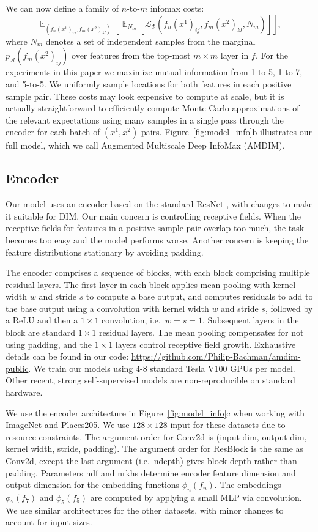 \documentclass{article}
\newcommand{\AAA}{\mathcal{A}}
\newcommand{\LL}{\mathcal{L}}
\DeclareMathOperator*{\expect}{\mathbb{E}}
\begin{document}
We can now define a family of $n$-to-$m$ infomax costs:
\begin{equation}
\expect_{(f_n(x^1)_{ij}, f_m(x^2)_{kl})} \left[ \expect_{N_m} \left[ \LL_{\Phi}(f_n(x^1)_{ij}, f_m(x^2)_{kl}, N_m) \right] \right],
\label{eq:nce_info_bound_n2m}
\end{equation}
where $N_m$ denotes a set of independent samples from the marginal $p_{\AAA}(f_m(x^2)_{ij})$ over features from the top-most $m \times m$ layer in $f$. For the experiments in this paper we maximize mutual information from 1-to-5, 1-to-7, and 5-to-5. We uniformly sample locations for both features in each positive sample pair. These costs may look expensive to compute at scale, but it is actually straightforward to efficiently compute Monte Carlo approximations of the relevant expectations using many samples in a single pass through the encoder for each batch of $(x^1, x^2)$ pairs. Figure~\ref{fig:model_info}b illustrates our full model, which we call Augmented Multiscale Deep InfoMax (AMDIM).

\subsection{Encoder}
Our model uses an encoder based on the standard ResNet \citep{He2016a, He2016b}, with changes to make it suitable for DIM. Our main concern is controlling receptive fields. When the receptive fields for features in a positive sample pair overlap too much, the task becomes too easy and the model performs worse. Another concern is keeping the feature distributions stationary by avoiding padding.

The encoder comprises a sequence of blocks, with each block comprising multiple residual layers. The first layer in each block applies mean pooling with kernel width $w$ and stride $s$ to compute a base output, and computes residuals to add to the base output using a convolution with kernel width $w$ and stride $s$, followed by a ReLU and then a $1 \times 1$ convolution, i.e.~$w=s=1$. Subsequent layers in the block are standard $1 \times 1$ residual layers. The mean pooling compensates for not using padding, and the $1 \times 1$ layers control receptive field growth. Exhaustive details can be found in our code: \url{https://github.com/Philip-Bachman/amdim-public}. We train our models using 4-8 standard Tesla V100 GPUs per model. Other recent, strong self-supervised models are non-reproducible on standard hardware.

We use the encoder architecture in Figure~\ref{fig:model_info}c when working with ImageNet and Places205.
We use $128 \times 128$ input for these datasets due to resource constraints.
The argument order for Conv2d is (input dim, output dim, kernel width, stride, padding). The argument order for ResBlock is the same as Conv2d, except the last argument (i.e.~ndepth) gives block depth rather than padding. Parameters ndf and nrkhs determine encoder feature dimension and output dimension for the embedding functions $\phi_n(f_n)$. The embeddings $\phi_7(f_7)$ and $\phi_5(f_5)$ are computed by applying a small MLP via convolution. We use similar architectures for the other datasets, with minor changes to account for input sizes.
\end{document}

